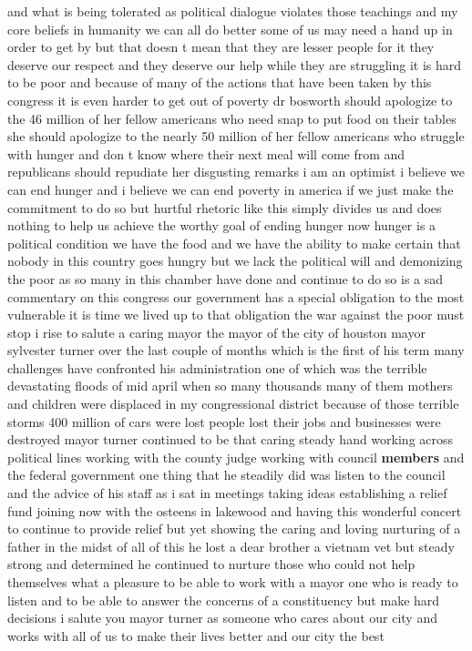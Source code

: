 \documentclass{article}
\begin{document}
and what is being tolerated as political dialogue violates those teachings and my core beliefs in humanity we can all do better some of us may need a hand up in order to get by but that doesn t mean that they are lesser people for it they deserve our respect and they deserve our help while they are struggling it is hard to be poor and because of many of the actions that have been taken by this congress it is even harder to get out of poverty dr bosworth should apologize to the 46 million of her fellow americans who need snap to put food on their tables she should apologize to the nearly 50 million of her fellow americans who struggle with hunger and don t know where their next meal will come from and republicans should repudiate her disgusting remarks i am an optimist i believe we can end hunger and i believe we can end poverty in america if we just make the commitment to do so but hurtful rhetoric like this simply divides us and does nothing to help us achieve the worthy goal of ending hunger now hunger is a political condition we have the food and we have the ability to make certain that nobody in this country goes hungry but we lack the political will and demonizing the poor as so many in this chamber have done and continue to do so is a sad commentary on this congress our government has a special obligation to the most vulnerable it is time we lived up to that obligation the war against the poor must stop
\vspace{8mm}
i rise to salute a caring mayor the mayor of the city of houston mayor sylvester turner over the last couple of months which is the first of his term many challenges have confronted his administration one of which was the terrible devastating floods of mid april when so many thousands many of them mothers and children were displaced in my congressional district because of those terrible storms 400 million of cars were lost people lost their jobs and businesses were destroyed mayor turner continued to be that caring steady hand working across political lines working with the county judge working with council {\bf \color{red} members} and the federal government one thing that he steadily did was listen to the council and the advice of his staff as i sat in meetings taking ideas establishing a relief fund joining now with the osteens in lakewood and having this wonderful concert to continue to provide relief but yet showing the caring and loving nurturing of a father in the midst of all of this he lost a dear brother a vietnam vet but steady strong and determined he continued to nurture those who could not help themselves what a pleasure to be able to work with a mayor one who is ready to listen and to be able to answer the concerns of a constituency but make hard decisions i salute you mayor turner as someone who cares about our city and works with all of us to make their lives better and our city the best
\end{document}
